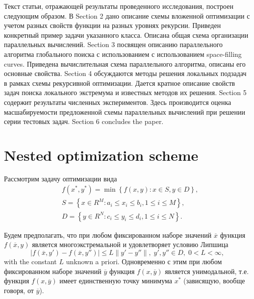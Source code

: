 \documentclass{svproc}
\begin{document}
Текст статьи, отражающей результаты проведенного исследования, построен следующим образом. 
В Section 2 дано описание схемы вложенной оптимизации с учетом разных свойств функции на разных уровнях рекурсии. Приведен конкретный пример задачи указанного класса. Описана общая схема организации параллельных вычислений. 
Section 3 посвящен описанию параллельного алгоритма глобального поиска с использованием с использованием space-filling curves. Приведена вычислительная схема параллельного алгоритма, описаны его основные свойства.
Section 4 обсуждаются методы решения локальных подзадач в рамках схемы рекурсивной оптимизации. Дается кратное описание свойств задач поиска локального экстремума и известных методов их решения. 
Section 5 содержит результаты численных экспериментов. Здесь производится оценка масшабируемости предложенной схемы параллельных вычислений при решении серии тестовых задач.  
Section 6 concludes the paper.


\section{Nested optimization scheme}

Рассмотрим задачу оптимизации вида
\begin{eqnarray}\label{main_problem}
& f(x^\ast,y^\ast)=\min{\left\{f(x,y):x\in S, y\in D\right\}}, \nonumber \\
& S=\left\{x\in R^M: a_i\leq x_i \leq b_i, 1\leq i \leq M\right\}, \\
& D=\left\{y\in R^N: c_i\leq y_i \leq d_i, 1\leq i \leq N\right\}. \nonumber
\end{eqnarray}

Будем предполагать, что при любом фиксированном наборе значений $\overline{x}$ функция $f(\overline{x},y)$ является многоэкстремальной и удовлетворяет условию Липшица
\[
\left|f(\overline{x},y')-f(\overline{x},y'')\right|\leq L\left\|y'-y''\right\|,\; y',y'' \in D,\; 0<L<\infty,
\]
with the constant $L$ unknown a priori.
Одновременно с этим при любом фиксированном наборе значений $\overline{y}$  функция $f(x,\overline{y})$ является унимодальной, т.е. функция $f(x,\overline{y})$ имеет единственную точку минимума $x^*$ (зависящую, вообще говоря, от $\overline{y}$). 
\end{document}
